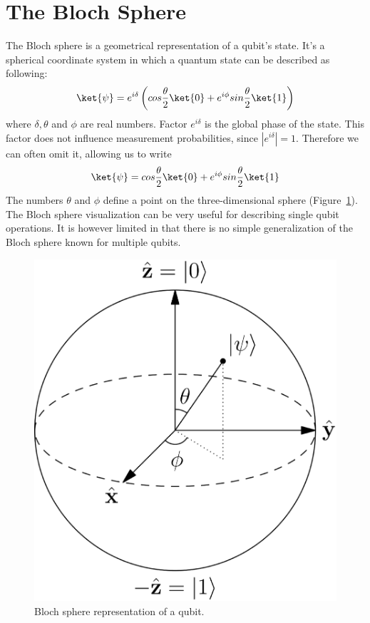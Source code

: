 \documentclass[11pt, notitlepage]{report}
\begin{document}
\section{The Bloch Sphere}
The Bloch sphere is a geometrical representation of a qubit's state. It's a spherical coordinate system in which a quantum state can be described as following:
\[
  \ket{\psi} = e^{i\delta} \left(cos\dfrac{\theta}{2}\ket{0} + e^{i\phi}sin\dfrac{\theta}{2}\ket{1}\right)
\]
where $\delta, \theta$ and $\phi$ are real numbers. Factor $e^{i\delta}$ is the global phase of the state. This factor does not influence measurement probabilities, since $\left|e^{i\delta}\right| = 1$. Therefore we can often omit it, allowing us to write
\[
  \ket{\psi} = cos\dfrac{\theta}{2}\ket{0} + e^{i\phi}sin\dfrac{\theta}{2}\ket{1}
\]
The numbers $\theta$ and $\phi$ define a point on the three-dimensional sphere (Figure~\ref{fig:bloch}). The Bloch sphere visualization can be very useful for describing single qubit operations. It is however limited in that there is no simple generalization of the Bloch sphere known for multiple qubits.
\begin{figure}[ht]
  \centering
  \includegraphics[scale=0.175]{images/bloch_sphere.eps}
  \vspace{2mm}
  \caption{Bloch sphere representation of a qubit.}
  \label{fig:bloch}
\end{figure}
\par
\newpage
\end{document}
